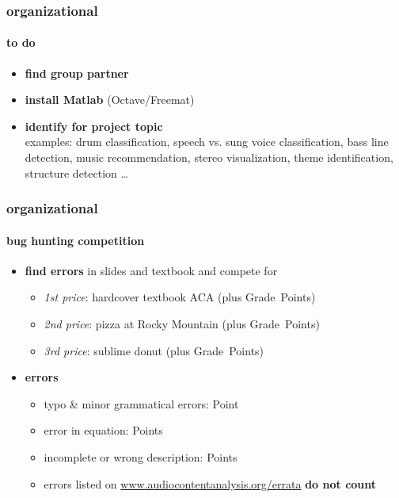         \begin{frame}\frametitle{organizational}\framesubtitle{to do}
            \begin{itemize}
                \item   \textbf{find group partner}
            
                \smallskip
                \item<2->   \textbf{install Matlab} (Octave/Freemat)
            
                \smallskip
                \item<3->   \textbf{identify for project topic}\\ examples: drum classification, speech vs. sung voice classification, bass line detection, music recommendation, stereo visualization, theme identification, structure detection \ldots
            \end{itemize}
        \end{frame}

        \begin{frame}\frametitle{organizational}\framesubtitle{bug hunting competition}
            \begin{itemize}
                \item   \textbf{find errors} in slides and textbook and compete for
                    \begin{itemize}
                        \item   \textit{1st price}: hardcover textbook ACA (plus \unit[3]{Grade Points})
                        \item   \textit{2nd price}: pizza at Rocky Mountain (plus \unit[2]{Grade Points})
                        \item   \textit{3rd price}: sublime donut (plus \unit[1]{Grade Points})
                    \end{itemize}
                
                \smallskip
                \item<2-> \textbf{errors}
                    \begin{itemize}
                        \item   typo \& minor grammatical errors: \unit[1]{Point}
                        \item   error in equation: \unit[2]{Points}
                        \item   incomplete or wrong description: \unit[3]{Points}
                        \item   errors listed on \url{www.audiocontentanalysis.org/errata} \textbf{do not count}
                    \end{itemize}
            \end{itemize}
        \end{frame}




